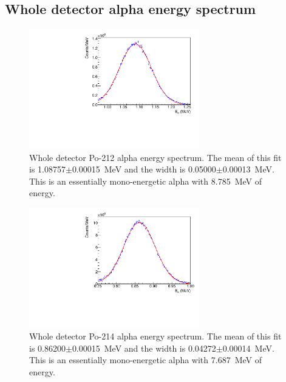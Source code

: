 \subsection{Whole detector alpha energy spectrum}
\begin{figure}[!h]
\centering
\includegraphics[width=0.66\textwidth]{figures/PubBiPo212AlphaE.pdf}
\caption{\label{fig:AlphaE212}Whole detector Po-212 alpha energy spectrum. The mean of this fit is 1.08757$\pm$0.00015~MeV and the width is 0.05000$\pm$0.00013~MeV. This is an essentially mono-energetic alpha with 8.785~MeV of energy.}
\end{figure}
\begin{figure}[!h]
\centering
\includegraphics[width=0.66\textwidth]{figures/PubBiPo214AlphaE.pdf}
\caption{\label{fig:AlphaE214}Whole detector Po-214 alpha energy spectrum. The mean of this fit is 0.86200$\pm$0.00015~MeV and the width is 0.04272$\pm$0.00014~MeV. This is an essentially mono-energetic alpha with 7.687~MeV of energy.}
\end{figure}
\newpage
